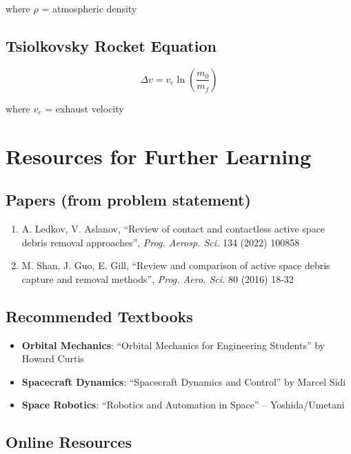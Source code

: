 \documentclass[11pt,a4paper]{article}
\begin{document}
where $\rho$ = atmospheric density

\subsection{Tsiolkovsky Rocket Equation}

\begin{equation}
\Delta v = v_e \ln\left(\frac{m_0}{m_f}\right)
\end{equation}

where $v_e$ = exhaust velocity

\section{Resources for Further Learning}

\subsection{Papers (from problem statement)}

\begin{enumerate}
    \item A. Ledkov, V. Aslanov, ``Review of contact and contactless active space debris removal approaches'', \textit{Prog. Aerosp. Sci.} 134 (2022) 100858
    \item M. Shan, J. Guo, E. Gill, ``Review and comparison of active space debris capture and removal methods'', \textit{Prog. Aero. Sci.} 80 (2016) 18-32
\end{enumerate}

\subsection{Recommended Textbooks}

\begin{itemize}[leftmargin=*]
    \item \textbf{Orbital Mechanics}: ``Orbital Mechanics for Engineering Students'' by Howard Curtis
    \item \textbf{Spacecraft Dynamics}: ``Spacecraft Dynamics and Control'' by Marcel Sidi
    \item \textbf{Space Robotics}: ``Robotics and Automation in Space'' -- Yoshida/Umetani
\end{itemize}

\subsection{Online Resources}
\end{document}
